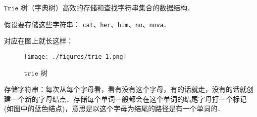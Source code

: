 
$\mathtt{Trie}$ 树（字典树）高效的存储和查找字符串集合的数据结构．

假设要存储这些字符串：
\verb|cat|、\verb|her|、\verb|him|、\verb|no|、\verb|nova|．

对应在图上就长这样：\begin{figure}[ht]
\centering
\texttt{[image: ./figures/trie\_1.png]}
\caption{$\mathtt{trie}$ 树} \label{trie_fig1}
\end{figure}

存储字符串：每次从每个字母看，看有没有这个字母，有的话就走，没有的话就创建一个新的字母结点．存储每个单词一般都会在这个单词的结尾字母打一个标记(如图中的蓝色结点)，意思是以这个字母为结尾的路径是有一个单词的．